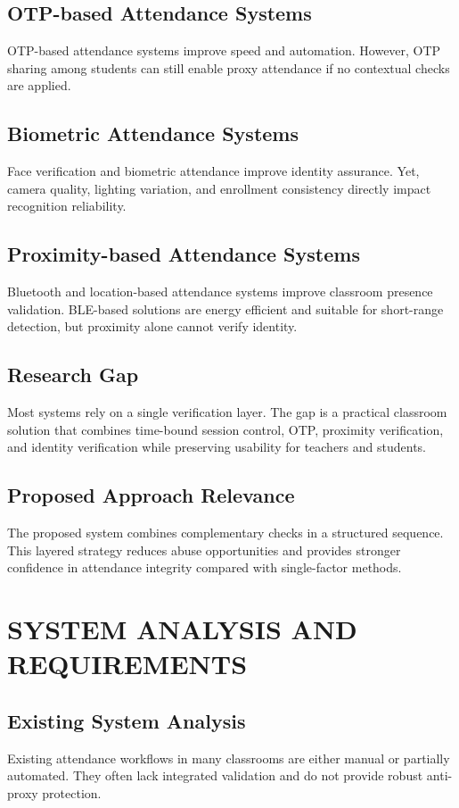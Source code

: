 \documentclass[12pt,a4paper]{report}
\begin{document}
\section{OTP-based Attendance Systems}
OTP-based attendance systems improve speed and automation. However, OTP sharing among students can still enable proxy attendance if no contextual checks are applied.

\section{Biometric Attendance Systems}
Face verification and biometric attendance improve identity assurance. Yet, camera quality, lighting variation, and enrollment consistency directly impact recognition reliability.

\section{Proximity-based Attendance Systems}
Bluetooth and location-based attendance systems improve classroom presence validation. BLE-based solutions are energy efficient and suitable for short-range detection, but proximity alone cannot verify identity.

\section{Research Gap}
Most systems rely on a single verification layer. The gap is a practical classroom solution that combines time-bound session control, OTP, proximity verification, and identity verification while preserving usability for teachers and students.

\section{Proposed Approach Relevance}
The proposed system combines complementary checks in a structured sequence. This layered strategy reduces abuse opportunities and provides stronger confidence in attendance integrity compared with single-factor methods.

\chapter{SYSTEM ANALYSIS AND REQUIREMENTS}
\section{Existing System Analysis}
Existing attendance workflows in many classrooms are either manual or partially automated. They often lack integrated validation and do not provide robust anti-proxy protection.
\end{document}
